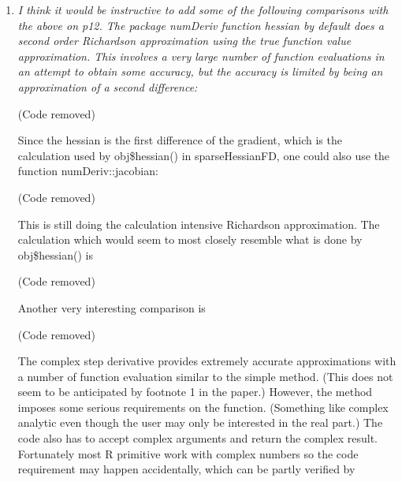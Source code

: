 \documentclass{article}
\newcommand{\code}[1]{\texttt{#1}}
\newcommand{\func}[1]{\code{#1}}
\newcommand{\class}[1]{\textsl{#1}}
\newenvironment{revQuote}{\itshape}{\vspace{\baselineskip}}
\newenvironment{response}{\normalfont}{\vspace{\baselineskip}}
\begin{document}
\begin{enumerate}[align=left]
\begin{revQuote}
(Code removed)

which might also be mentioned in the text. (Really just for exposition
purposes, after all, it is almost the main purpose of the package.)
  \end{revQuote}

\begin{response}
  Good point.  I revised that section to explain that evaluations of
  the function and gradient, as called from the
  \class{sparseHessianFD} object, have to be identical to the true values.
  I replaced \func{all.equal} with \func{identical} to
  highlight that fact. I then explain that the
  \class{sparseHessianFD} calculation of the Hessian will not be
  identical to the true value, and report the mean relative
  difference.  I chose the mean relative difference over maximum
  absolute difference to be consistent with what \func{all.equal}
  uses to test if two matrices are equal within numeric tolerance.
\end{response}


\item \label{it:complex1}\begin{revQuote}
I think it would be instructive to add some of the following comparisons
with the above on p12.  The package numDeriv function hessian by default
does a second order Richardson approximation using the true function value
approximation. This involves a very large number of function evaluations in
an attempt to obtain some accuracy, but the accuracy is limited by being an
approximation of a second difference:

(Code removed)

Since the hessian is the first difference of the gradient, which is the
calculation used by obj\$hessian() in sparseHessianFD, one could also use the
function numDeriv::jacobian:

(Code removed)

This is still doing the calculation intensive Richardson approximation. The
calculation which would seem to most closely resemble what is done by
obj\$hessian() is

(Code removed)


Another very interesting comparison is

(Code removed)

The complex step derivative provides extremely accurate approximations with
a  number of function evaluation similar to the simple method. (This does
not seem to be anticipated by footnote 1 in the paper.) However, the method
imposes some serious requirements on the function. (Something like complex
analytic even though the user may only be interested in the real part.) The
code also has to accept complex arguments and return the complex result.
Fortunately most R primitive work with complex numbers so the code
requirement may happen accidentally, which can be partly verified by


\end{revQuote}
\end{enumerate}
\end{document}
